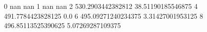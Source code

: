 0 nan nan
1 nan nan
2 530.2903442382812 38.51190185546875
4 491.7784423828125 0.0
6 495.09271240234375 3.31427001953125
8 496.85113525390625 5.07269287109375
